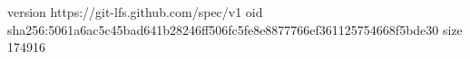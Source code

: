 version https://git-lfs.github.com/spec/v1
oid sha256:5061a6ac5c45bad641b28246ff506fc5fe8e8877766ef361125754668f5bde30
size 174916
